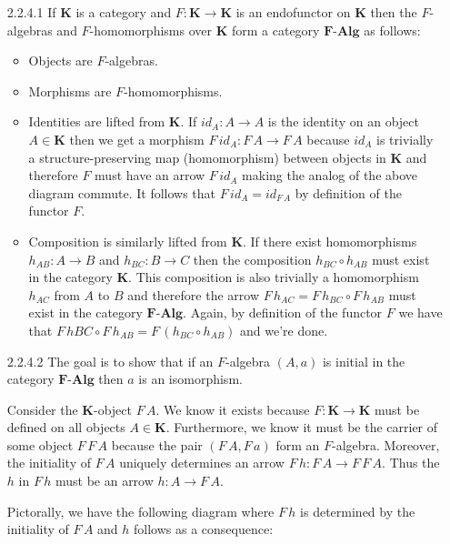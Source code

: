 \documentclass{article}
\newcommand{\facat}{\textbf{F-Alg}}
\newcommand{\kcat}{\mathbf{K}}
\begin{document}
\begin{enumerate}
\newpage
\item [2.2.4.1]
  If $\kcat$ is a category and $F: \kcat \rightarrow \kcat$ is an endofunctor on $\kcat$ then the $F$-algebras and $F$-homomorphisms over $\kcat$ form a category $\facat$ as follows:
  \begin{itemize}
  \item Objects are $F$-algebras.
  \item Morphisms are $F$-homomorphisms.
  \item Identities are lifted from $\kcat$.
  \subitem If $id_A : A \rightarrow A$ is the identity on an object $A \in \kcat$ then we get a morphism $F\,id_A : F\,A \rightarrow F\,A$ because $id_A$ is trivially a structure-preserving map (homomorphism) between objects in $\kcat$ and therefore $F$ must have an arrow $F\,id_A$ making the analog of the above diagram commute.
  It follows that $F\,id_A = id_{F\,A}$ by definition of the functor $F$.
  \item Composition is similarly lifted from $\kcat$.
  \subitem If there exist homomorphisms $h_{AB} : A \rightarrow B$ and $h_{BC} : B \rightarrow C$ then the composition $h_{BC} \circ h_{AB}$ must exist in the category $\kcat$.
    This composition is also trivially a homomorphism $h_{AC}$ from $A$ to $B$ and therefore the arrow $F\,h_{AC} = F\,h_{BC} \circ F\,h_{AB}$ must exist in the category $\facat$.
    Again, by definition of the functor $F$ we have that $F\,h{BC} \circ F\,h_{AB} = F\,(h_{BC} \circ h_{AB})$ and we're done.
  \end{itemize}

\newpage
\item [2.2.4.2]
  The goal is to show that if an $F$-algebra $(A,a)$ is initial in the category $\facat$ then $a$ is an isomorphism.

  \subitem 
  Consider the $\kcat$-object $F\,A$.
  We know it exists because $F : \kcat \rightarrow \kcat$ must be defined on all objects $A \in \kcat$.
  Furthermore, we know it must be the carrier of some object $F\,F\,A$ because the pair $(F\,A, F\,a)$ form an $F$-algebra.
  Moreover, the initiality of $F\,A$ uniquely determines an arrow $F\,h : F\,A \rightarrow F\,F\,A$.
  Thus the $h$ in $F\,h$ must be an arrow $h : A \rightarrow F\,A$.
  
  \subitem 
  Pictorally, we have the following diagram where $F\,h$ is determined by the initiality of $F\,A$ and $h$ follows as a consequence:
  \begin{center}
\end{center}
\end{enumerate}
\end{document}
